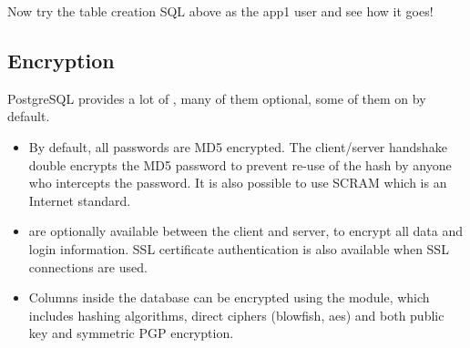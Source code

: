 \documentclass[a4paper,11pt,english]{sphinxmanual}
\begin{document}
Now try the table creation SQL above as the app1 user and see how it goes!


\subsection{Encryption}
\label{\detokenize{maintenance:encryption}}
PostgreSQL provides a lot of , many of them optional, some of them on by default.
\begin{itemize}
\item {} 
By default, all passwords are MD5 encrypted. The client/server handshake double encrypts the MD5 password to prevent re-use of the hash by anyone who intercepts the password. It is also possible to use SCRAM which is an Internet standard.

\item {} 
 are optionally available between the client and server, to encrypt all data and login information. SSL certificate authentication is also available when SSL connections are used.

\item {} 
Columns inside the database can be encrypted using the  module, which includes hashing algorithms, direct ciphers (blowfish, aes) and both public key and symmetric PGP encryption.

\end{itemize}
\end{document}
